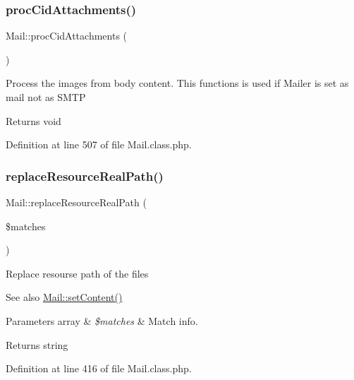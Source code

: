 \subsubsection{\texorpdfstring{proc\+Cid\+Attachments()}{procCidAttachments()}}
{\footnotesize\ttfamily Mail\+::proc\+Cid\+Attachments (\begin{DoxyParamCaption}{ }\end{DoxyParamCaption})}

Process the images from body content. This functions is used if Mailer is set as mail not as S\+M\+TP

\begin{DoxyReturn}{Returns}
void 
\end{DoxyReturn}


Definition at line 507 of file Mail.\+class.\+php.

\mbox{\label{classMail_ae3182bb75fb675d2baceaf2c38dc7edd}} 
\subsubsection{\texorpdfstring{replace\+Resource\+Real\+Path()}{replaceResourceRealPath()}}
{\footnotesize\ttfamily Mail\+::replace\+Resource\+Real\+Path (\begin{DoxyParamCaption}\item[{}]{\$matches }\end{DoxyParamCaption})}

Replace resourse path of the files

\begin{DoxySeeAlso}{See also}
\hyperlink{classMail_a2112ae431d2a140d8624b943cf0eace9}{Mail\+::set\+Content()} 
\end{DoxySeeAlso}

\begin{DoxyParams}[1]{Parameters}
array & {\em \$matches} & Match info. \\
\hline
\end{DoxyParams}
\begin{DoxyReturn}{Returns}
string 
\end{DoxyReturn}


Definition at line 416 of file Mail.\+class.\+php.

\mbox{\label{classMail_afe036d54e43919318cb8e081533e7b90}} 
